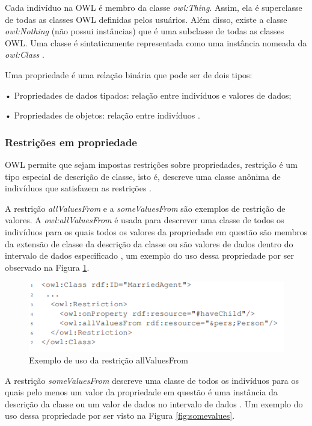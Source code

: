 \documentclass{bcc}
\begin{document}
Cada indivíduo na OWL é membro da classe \textit{owl:Thing}. Assim, ela é superclasse de todas as classes OWL definidas pelos usuários. Além disso, existe a classe \textit{owl:Nothing} (não possui instâncias) que é uma subclasse de todas as classes OWL. Uma classe é sintaticamente representada como uma instância nomeada da \textit{owl:Class} \cite{de2005}.

Uma propriedade é uma relação binária que pode ser de dois tipos:

• Propriedades de dados tipados: relação entre indivíduos e valores
de dados;

• Propriedades de objetos: relação entre indivíduos \cite{welty2004}.

\subsubsection{Restrições em propriedade}

OWL permite que sejam impostas restrições sobre propriedades, restrição é um tipo especial de descrição de classe, isto é, descreve uma classe anônima de indivíduos que satisfazem as restrições \cite{de2005}.

A restrição \textit{allValuesFrom} e a \textit{someValuesFrom} são exemplos de restrição de valores. A \textit{owl:allValuesFrom} é usada para descrever uma classe de todos os indivíduos para os quais todos os valores da propriedade em questão são membros da extensão de classe da descrição da classe ou são valores de dados dentro do intervalo de dados especificado \cite{welty2004}, um exemplo do uso dessa propriedade por ser observado na Figura \ref{fig:allvalues}.

\begin{figure}[H]
\centering
\includegraphics[width=.9\textwidth]{Figuras/all_values.PNG}
\caption{Exemplo de uso da restrição allValuesFrom}
\label{fig:allvalues}
\end{figure}

A restrição \textit{someValuesFrom} descreve uma classe de todos os indivíduos para os quais pelo menos um valor da propriedade em questão é uma instância da descrição da classe ou um valor de dados no intervalo de dados \cite{welty2004}. Um exemplo do uso dessa propriedade por ser visto na Figura \ref{fig:somevalues}.
\end{document}
